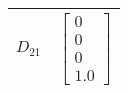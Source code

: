 \begin{tabular}{cl}
 $D_{21}$ & $\left[\begin{matrix}0\\0\\0\\1.0\end{matrix}\right]$                                                                                                                                                                                                                                                                                                                                     \\
\hline
\end{tabular}